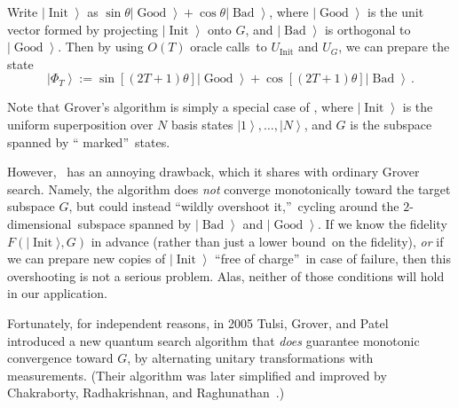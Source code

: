 \begin{lemma}
\label{aa}Write $\left\vert
\operatorname*{Init}\right\rangle $ as $\sin\theta\left\vert
\operatorname*{Good}\right\rangle +\cos\theta\left\vert \operatorname*{Bad}%
\right\rangle $, where $\left\vert \operatorname*{Good}\right\rangle $ is the
unit vector formed by projecting $\left\vert \operatorname*{Init}\right\rangle
$ onto $G$, and $\left\vert \operatorname*{Bad}\right\rangle $ is orthogonal
to $\left\vert \operatorname*{Good}\right\rangle $. Then by using $O\left(
T\right)  $ oracle calls\ to $U_{\operatorname*{Init}}$ and $U_{G}$, we can
prepare the state%
\[
\left\vert \Phi_{T}\right\rangle :=\sin\left[  \left(  2T+1\right)
\theta\right]  \left\vert \operatorname*{Good}\right\rangle +\cos\left[
\left(  2T+1\right)  \theta\right]  \left\vert \operatorname*{Bad}%
\right\rangle\,.
\]

\end{lemma}

Note that Grover's algorithm is simply a special case of , where
$\left\vert \operatorname*{Init}\right\rangle $ is the uniform superposition
over $N$ basis states $\left\vert 1\right\rangle ,\ldots,\left\vert
N\right\rangle $, and $G$ is the subspace spanned by \textquotedblleft
marked\textquotedblright\ states.

However, \ has an annoying drawback, which it shares with
ordinary Grover search. Namely, the algorithm does \emph{not} converge
monotonically toward the target subspace $G$, but could instead
\textquotedblleft wildly overshoot it,\textquotedblright\ cycling around the
$2$-dimensional\ subspace spanned by $\left\vert \operatorname*{Bad}%
\right\rangle $ and $\left\vert \operatorname*{Good}\right\rangle $. If we
know the fidelity $F(\vert \operatorname*{Init}\rangle
,G)$ in advance (rather than just a lower bound\ on the fidelity),
\emph{or} if we can prepare new copies of $\left\vert \operatorname*{Init}%
\right\rangle $ \textquotedblleft free of charge\textquotedblright\ in case of
failure, then this overshooting is not a serious problem. Alas, neither of
those conditions will hold in our application.

Fortunately, for independent reasons, in 2005 Tulsi, Grover, and Patel~\cite{tgp} introduced a new quantum search algorithm that \emph{does}
guarantee monotonic convergence toward $G$, by alternating unitary
transformations with measurements. (Their algorithm was later simplified and
improved by Chakraborty, Radhakrishnan, and Raghunathan~\cite{crr}.)

